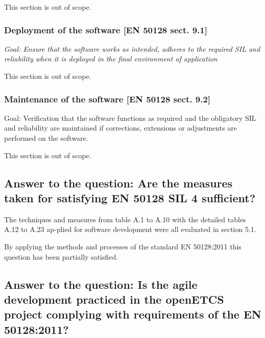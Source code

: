 \bigskip

This section is out of scope.
\bigskip

\subsubsection{Deployment of the software [EN 50128 sect. 9.1]}
\textit{Goal: Ensure that the software works as intended, adheres to the required SIL and reliability when it is deployed in the final environment of application}


\bigskip

This section is out of scope.
\bigskip

\subsubsection{Maintenance of the software [EN 50128 sect. 9.2]}
Goal: Verification that the software functions as required and the obligatory SIL and reliability are maintained if
corrections, extensions or adjustments are performed on the software.
\bigskip

\bigskip

This section is out of scope.
\bigskip

\subsection{Answer to the question: Are the measures taken for satisfying EN 50128 SIL 4 sufficient?}
\bigskip
The techniques and measures from table A.1 to A.10 with the detailed tables A.12 to A.23 ap-plied for software development were all evaluated in section 5.1.
\newline
\newline

By applying the methods and processes of the standard EN 50128:2011 this question has been partially satisfied. 
\bigskip

\subsection{Answer to the question: Is the agile development practiced in the openETCS project complying with requirements of the EN 50128:2011?}


